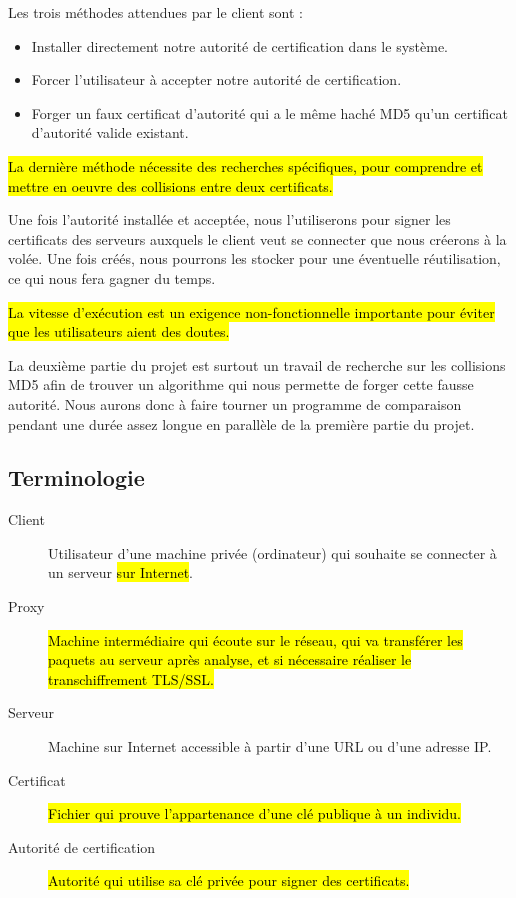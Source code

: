 \documentclass[a4paper,11pt,french]{article}
\begin{document}



Les trois méthodes attendues par le client sont :
\begin{itemize}
\item Installer directement notre autorité de certification dans le système.
\item Forcer l'utilisateur à accepter notre autorité de certification.
\item Forger un faux certificat d'autorité qui a le même haché MD5 qu'un certificat d'autorité valide existant.
\end{itemize}

\hl{La dernière méthode nécessite des recherches spécifiques, pour comprendre et mettre en oeuvre des collisions entre deux certificats.}


Une fois l'autorité installée et acceptée, nous l'utiliserons pour signer les certificats des serveurs auxquels le client veut se connecter que nous créerons à la volée. Une fois créés, nous pourrons les stocker pour une éventuelle réutilisation, ce qui nous fera gagner du temps.


\hl{La vitesse d'exécution est un exigence non-fonctionnelle importante pour éviter que les utilisateurs aient des doutes.}

La deuxième partie du projet est surtout un travail de recherche sur les collisions MD5 afin de trouver un algorithme qui nous permette de forger cette fausse autorité. Nous aurons donc à faire tourner un programme de comparaison pendant une durée assez longue en parallèle de la première partie du projet.

\subsection{Terminologie}

\begin{description}
\item[Client] Utilisateur d'une machine privée (ordinateur) qui souhaite se connecter à un serveur \hl{sur Internet}.
\item[Proxy] \hl{Machine intermédiaire qui écoute sur le réseau, qui va transférer les paquets au serveur après analyse, et si nécessaire réaliser le transchiffrement TLS/SSL.}
\item[Serveur] Machine sur Internet accessible à partir d'une URL ou d'une adresse IP.
\item[Certificat] \hl{Fichier qui prouve l'appartenance d'une clé publique à un individu.}
\item[Autorité de certification] \hl{Autorité qui utilise sa clé privée pour signer des certificats.}

\end{description}
\end{document}

